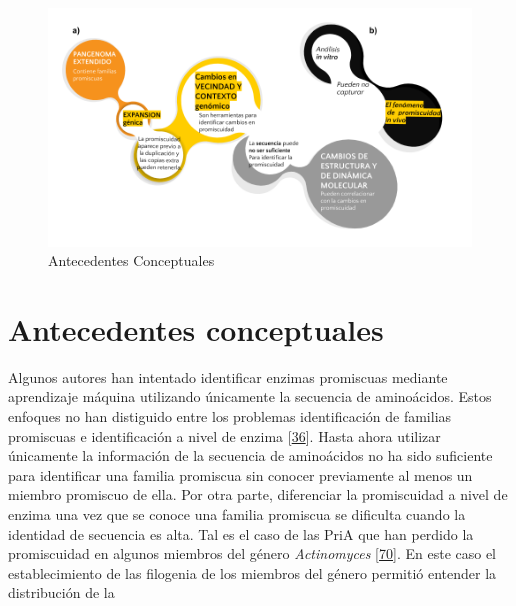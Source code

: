 \documentclass[12pt,twoside]{reedthesis}
\begin{document}
  \begin{figure}[h!tbp]
  \centering
  \includegraphics[angle = 0,scale = 0.5]{chapter0/AntecedentesConceptuales.png}
  \caption[Antecedentes Conceptuales]{\normalsize{Antecedentes Conceptuales}}
  \label{fig:Antecedentes conceptuales de promiscuidad}
  \end{figure}
  
  \section{Antecedentes conceptuales}\label{antecedentes-conceptuales}
  
  Algunos autores han intentado identificar enzimas promiscuas mediante
  aprendizaje máquina utilizando únicamente la secuencia de aminoácidos.
  Estos enfoques no han distiguido entre los problemas identificación de
  familias promiscuas e identificación a nivel de enzima
  {[}\protect\hyperlink{ref-carbonell_molecular_2010}{36}{]}. Hasta ahora
  utilizar únicamente la información de la secuencia de aminoácidos no ha
  sido suficiente para identificar una familia promiscua sin conocer
  previamente al menos un miembro promiscuo de ella. Por otra parte,
  diferenciar la promiscuidad a nivel de enzima una vez que se conoce una
  familia promiscua se dificulta cuando la identidad de secuencia es alta.
  Tal es el caso de las PriA que han perdido la promiscuidad en algunos
  miembros del género \emph{Actinomyces}
  {[}\protect\hyperlink{ref-juarez-vazquez_evolution_2017}{70}{]}. En este
  caso el establecimiento de las filogenia de los miembros del género
  permitió entender la distribución de la
  
\end{document}
